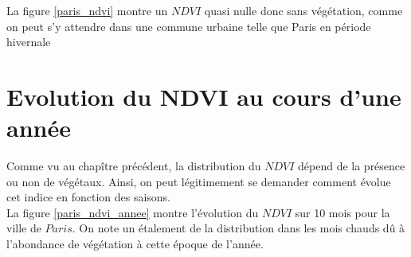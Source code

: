 \documentclass{book}
\begin{document}
La figure \ref{paris_ndvi} montre un $NDVI$ quasi nulle donc sans végétation, comme on peut s'y attendre dans une commune urbaine telle que Paris en période hivernale\\

\clearpage


\chapter{Evolution du NDVI au cours d'une année}

Comme vu au chapître précédent, la distribution du $NDVI$ dépend de la présence ou non de végétaux. Ainsi, on peut légitimement se demander comment évolue 
cet indice en fonction des saisons.\\
La figure \ref{paris_ndvi_annee} montre l'évolution du $NDVI$ sur 10 mois pour la ville de $Paris$. On note un étalement de la distribution dans les mois chauds d\^u à l'abondance de végétation à cette époque
de l'année.
\end{document}
